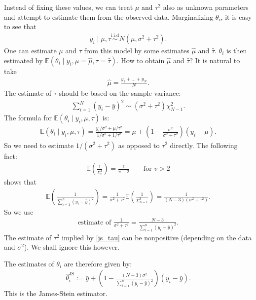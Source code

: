 \documentclass{scrartcl}
\newcommand{\E}{{\mathbb E}}
\def\qt#1{\qquad\text{#1}}
\begin{document}
Instead of fixing these values, we can treat $\mu$ and $\tau^2$ also
as unknown parameters and attempt to estimate them from the observed
data. Marginalizing $\theta_i$, it is easy to see that
\begin{align*}
  y_i \mid \mu, \tau \overset{\text{i.i.d}}{\sim} N(\mu, \sigma^2
  + \tau^2). 
\end{align*}
One can estimate $\mu$ and $\tau$ from this model by some estimates
$\hat{\mu}$ and $\hat{\tau}$. $\theta_i$ is then estimated by
$\E(\theta_i \mid y_i, \mu = \hat{\mu}, \tau = \hat{\tau})$. How to
obtain $\hat{\mu}$ and $\hat{\tau}$? It is natural to take
\begin{align*}
  \hat{\mu} = \frac{y_1 + \dots + y_N}{N}. 
\end{align*}
The estimate of $\tau$ should be based on the sample variance:
\begin{align*}
  \sum_{i=1}^N(y_i - \bar{y})^2 \sim \left(\sigma^2 + \tau^2\right)
  \chi^2_{N-1}. 
\end{align*}
The formula for $\E(\theta_i \mid y_i, \mu, \tau)$ is:
\begin{align*}
  \E(\theta_i \mid y_i, \mu, \tau) = \frac{y_i/\sigma^2 +
  \mu/\tau^2}{1/\sigma^2 + 1/\tau^2} = \mu + \left(1 -
  \frac{\sigma^2}{\sigma^2 + \tau^2} \right) (y_i - \mu). 
\end{align*}
So we need to estimate $1/(\sigma^2 + \tau^2)$ as opposed to $\tau^2$
directly. The following fact: 
\begin{align*}
  \E \left(\frac{1}{\chi^2_{v}} \right) = \frac{1}{v-2} \qt{for $v > 2$}
\end{align*}
shows that
\begin{align*}
  \E \left(\frac{1}{\sum_{i=1}^n (y_i - \bar{y})^2} \right) =
  \frac{1}{\sigma^2 + \tau^2} \E \left(\frac{1}{\chi^2_{N-1}} \right)
  = \frac{1}{(N-3)(\sigma^2 + \tau^2)}. 
\end{align*}
So we use
\begin{align}\label{js_tau}
\text{estimate of }
  \frac{1}{\sigma^2 + \tau^2} =   \frac{N-3}{\sum_{i=1}^n (y_i -
  \bar{y})^2}. 
\end{align}
The estimate of $\tau^2$ implied by \eqref{js_tau} can  be nonpositive
(depending on the data and $\sigma^2$). We shall ignore this however.  

The estimates of $\theta_i$ are therefore given by:
\begin{align*}
\hat{\theta}_i^{\text{JS}} := \bar{y} + \left(1 - \frac{(N-3)
  \sigma^2}{\sum_{i=1}^n (y_i - \bar{y})^2} \right) \left(y_i -
  \bar{y} \right).  
\end{align*}
This is the James-Stein estimator.
\end{document}

